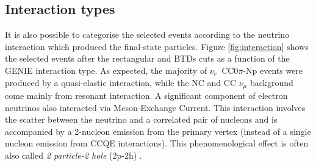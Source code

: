 \subsection{Interaction types}
It is also possible to categorise the selected events according to the neutrino interaction which produced the final-state particles. Figure \ref{fig:interaction} shows the selected events after the rectangular and BTDs cuts as a function of the GENIE interaction type. 
As expected, the majority of $\nu_e$~CC0$\pi$-Np events were produced by a quasi-elastic interaction, while the NC and CC $\nu_{\mu}$ background come mainly from resonant interaction. A significant component of electron neutrinos also interacted via Meson-Exchange Current. This interaction involves the scatter between the neutrino and a correlated pair of nucleons and is accompanied by a 2-nucleon emission from the primary vertex (instead of a single nucleon emission from CCQE interactions). This phenomenological effect is often also called \emph{2 particle-2 hole} (2p-2h) \cite{Katori:2013eoa}.

